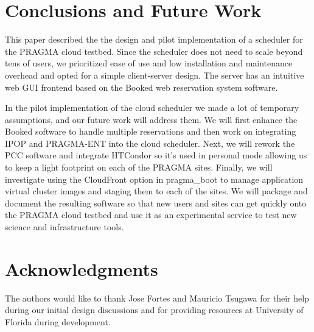 \documentclass{acm_proc_article-sp}
\begin{document}
\section{Conclusions and Future Work}
\label{Sec:Conclusions}

This paper described the the design and pilot implementation of a  scheduler for the PRAGMA cloud testbed.  Since the scheduler does not need to scale beyond tens of users, we prioritized ease of use and low installation and maintenance overhead and opted for a simple client-server design.  The server has an intuitive web GUI frontend based on the Booked web reservation system software.  

In the pilot implementation of the cloud scheduler  we made a lot of temporary assumptions, and  our future work will address them.  We will first enhance the Booked software to handle multiple reservations and then work on integrating IPOP and PRAGMA-ENT into the cloud scheduler.  Next, we will rework the PCC software and integrate HTCondor so it's used in personal mode allowing us to keep a light footprint on each of the PRAGMA sites.  Finally, we will investigate using the CloudFront option in pragma\_boot to manage application virtual cluster images and staging them to each of the sites.     We will package and document the resulting software so that new users and sites can get quickly onto the PRAGMA cloud testbed and use it as an experimental service to test new science and infrastructure tools.


\section{Acknowledgments}

The authors would like to thank Jose Fortes and Mauricio Tsugawa for their help during our initial design discussions and for providing resources at University of Florida during development.


  
\end{document}
